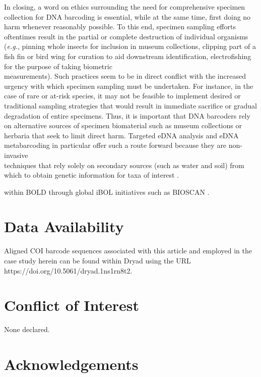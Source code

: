 In closing, a word on ethics surrounding the need for comprehensive specimen \\ collection for DNA barcoding is essential, while at the same time, first doing no harm whenever reasonably possible. To this end, specimen sampling efforts oftentimes result in the partial or complete destruction of individual organisms (\textit{e.g.}, pinning whole insects for inclusion in museum collections, clipping part of a fish fin or bird wing for curation to aid downstream identification, electrofishing for the purpose of taking biometric \\ measurements). Such practices seem to be in direct conflict with the increased urgency with which specimen sampling must be undertaken. For instance, in the case of rare or at-risk species, it may not be feasible to implement desired or traditional sampling strategies that would result in immediate sacrifice or gradual degradation of entire specimens. Thus, it is important that DNA barcoders rely on alternative sources of specimen biomaterial such as museum collections or herbaria that seek to limit direct harm. Targeted eDNA analysis and eDNA metabarcoding in particular offer such a route forward because they are non-invasive \\ techniques that rely solely on secondary sources (such as water and soil) from which to obtain genetic information for taxa of interest \cite{thomsen2015environmental}.


within BOLD through global iBOL initiatives such as BIOSCAN \cite{hobern2020bioscan, hobern2019bioscan}.  


\newpage

\section*{Data Availability}

Aligned COI barcode sequences associated with this article and employed in the case study herein can be found within Dryad using the URL \\ https://doi.org/10.5061/dryad.1ns1rn8t2.

\section*{Conflict of Interest}

None declared.

\section*{Acknowledgements}

